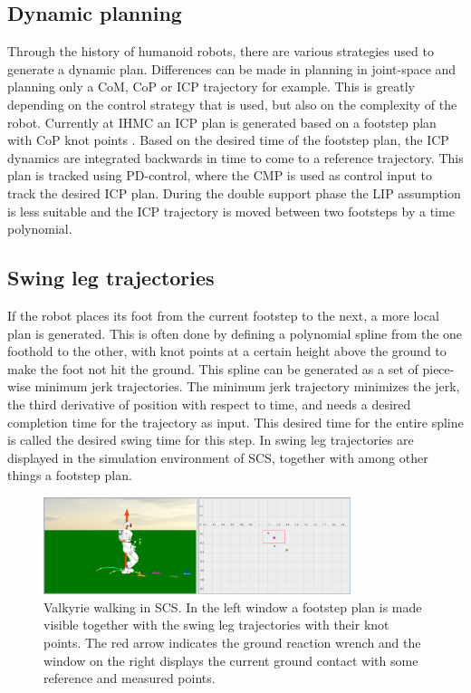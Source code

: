 \subsection{Dynamic planning}
Through the history of humanoid robots, there are various strategies used to generate a dynamic plan. Differences can be made in planning in joint-space and planning only a \ac{CoM}, \ac{CoP} or \ac{ICP} trajectory for example. This is greatly depending on the control strategy that is used, but also on the complexity of the robot. Currently at IHMC an \ac{ICP} plan is generated based on a footstep plan with \ac{CoP} knot points \cite{englsberger2014trajectory}. Based on the desired time of the footstep plan, the \ac{ICP} dynamics are integrated backwards in time to come to a reference trajectory. This plan is tracked using PD-control, where the \ac{CMP} is used as control input to track the desired \ac{ICP} plan. During the double support phase the \ac{LIP} assumption is less suitable and the \ac{ICP} trajectory is moved between two footsteps by a time polynomial.  

\subsection{Swing leg trajectories}
If the robot places its foot from the current footstep to the next, a more local plan is generated. This is often done by defining a polynomial spline from the one foothold to the other, with knot points at a certain height above the ground to make the foot not hit the ground. This spline can be generated as a set of piece-wise minimum jerk trajectories. The minimum jerk trajectory minimizes the jerk, the third derivative of position with respect to time, and needs a desired completion time for the trajectory as input. This desired time for the entire spline is called the desired swing time for this step. In  swing leg trajectories are displayed in the simulation environment of \ac{SCS}, together with among other things a footstep plan.

\begin{figure}[h]
\centering
\includegraphics[width=0.8\textwidth]{STYLESTUFF/SCSValSS.png}
\caption{Valkyrie walking in \ac{SCS}. In the left window a footstep plan is made visible together with the swing leg trajectories with their knot points. The red arrow indicates the ground reaction wrench and the window on the right displays the current ground contact with some reference and measured points.}
\label{fig:scsval}
\end{figure}

